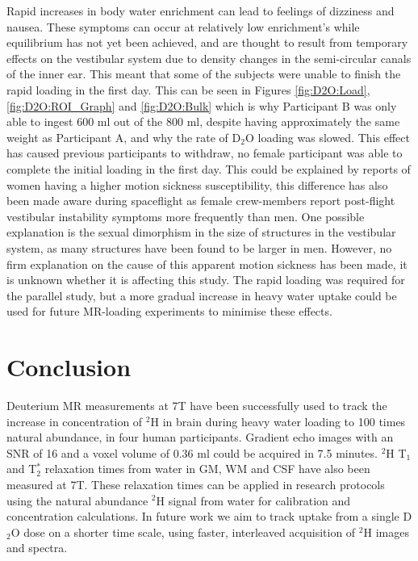 \documentclass[class=article, crop=false]{standalone}
\begin{document}
Rapid increases in body water enrichment can lead to feelings of dizziness and nausea. These symptoms can occur at relatively low enrichment's while equilibrium has not yet been achieved, and are thought to result from temporary effects on the vestibular system due to density changes in the semi-circular canals of the inner ear\cite{Money1974HeavyAlcohol}. This meant that some of the subjects were unable to finish the rapid loading in the first day. This can be seen in Figures \ref{fig:D2O:Load}, \ref{fig:D2O:ROI_Graph} and \ref{fig:D2O:Bulk} which is why Participant B was only able to ingest 600 ml out of the 800 ml, despite having approximately the same weight as Participant A, and why the rate of D$_2$O loading was slowed. This effect has caused previous participants to withdraw, no female participant was able to complete the initial loading in the first day. This could be explained by reports of women having a higher motion sickness susceptibility\cite{Flanagan2005SexSickness.}, this difference has also been made aware during spaceflight as female crew-members report post-flight vestibular instability symptoms more frequently than men\cite{Reschke2014EffectsSystems}. One possible explanation is the sexual dimorphism in the size of structures in the vestibular system, as many structures have been found to be larger in men\cite{Sato2016Computer-AidedApparatus}. However, no firm explanation on the cause of this apparent motion sickness has been made, it is unknown whether it is affecting this study. The rapid loading was required for the parallel study, but a more gradual increase in heavy water uptake could be used for future MR-loading experiments to minimise these effects. 

\section{Conclusion}

Deuterium MR measurements at 7T have been successfully used to track the increase in concentration of $^2$H in brain during heavy water loading to 100 times natural abundance, in four human participants. Gradient echo images with an SNR of 16 and a voxel volume of 0.36 ml could be acquired in 7.5 minutes. $^2$H T$_1$ and T$_2^*$ relaxation times from water in GM, WM and CSF have also been measured at 7T. These relaxation times can be applied in research protocols using the natural abundance $^2$H signal from water for calibration and concentration calculations. In future work we aim to track uptake from a single D$_2$O dose on a shorter time scale, using faster, interleaved acquisition of $^2$H images and spectra.

\end{document}
